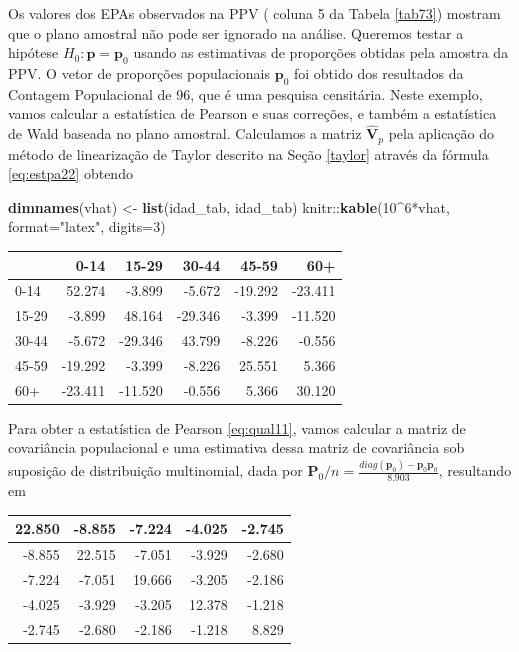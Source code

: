 \documentclass[]{book}
\newenvironment{Shaded}{\begin{snugshade}}{\end{snugshade}}
\newcommand{\KeywordTok}[1]{\textcolor[rgb]{0.13,0.29,0.53}{\textbf{{#1}}}}
\newcommand{\DataTypeTok}[1]{\textcolor[rgb]{0.13,0.29,0.53}{{#1}}}
\newcommand{\DecValTok}[1]{\textcolor[rgb]{0.00,0.00,0.81}{{#1}}}
\newcommand{\StringTok}[1]{\textcolor[rgb]{0.31,0.60,0.02}{{#1}}}
\newcommand{\NormalTok}[1]{{#1}}
\numberwithin{example}{chapter}
\numberwithin{remark}{chapter}
\numberwithin{definition}{chapter}
\begin{document}
Os valores dos EPAs observados na PPV ( coluna 5 da Tabela \ref{tab73})
mostram que o plano amostral não pode ser ignorado na análise. Queremos
testar a hipótese \(H_{0}:\mathbf{p=p}_{0}\) usando as estimativas de
proporções obtidas pela amostra da PPV. O vetor de proporções
populacionais \(\mathbf{p}_{0}\) foi obtido dos resultados da Contagem
Populacional de 96, que é uma pesquisa censitária. Neste exemplo, vamos
calcular a estatística de Pearson e suas correções, e também a
estatística de Wald baseada no plano amostral. Calculamos a matriz
\(\widehat{\mathbf{V}}_{p}\) pela aplicação do método de linearização de
Taylor descrito na Seção \ref{taylor} através da fórmula
\eqref{eq:estpa22} obtendo

\begin{Shaded}
\begin{Highlighting}[]
\KeywordTok{dimnames}\NormalTok{(vhat) <-}\StringTok{ }\KeywordTok{list}\NormalTok{(idad_tab, idad_tab)}
\NormalTok{knitr::}\KeywordTok{kable}\NormalTok{(}\DecValTok{10}\NormalTok{^}\DecValTok{6}\NormalTok{*vhat, }\DataTypeTok{format=}\StringTok{"latex"}\NormalTok{, }\DataTypeTok{digits=}\DecValTok{3}\NormalTok{)}
\end{Highlighting}
\end{Shaded}

\begin{tabular}{l|r|r|r|r|r}
\hline
  & 0-14 & 15-29 & 30-44 & 45-59 & 60+\\
\hline
0-14 & 52.274 & -3.899 & -5.672 & -19.292 & -23.411\\
\hline
15-29 & -3.899 & 48.164 & -29.346 & -3.399 & -11.520\\
\hline
30-44 & -5.672 & -29.346 & 43.799 & -8.226 & -0.556\\
\hline
45-59 & -19.292 & -3.399 & -8.226 & 25.551 & 5.366\\
\hline
60+ & -23.411 & -11.520 & -0.556 & 5.366 & 30.120\\
\hline
\end{tabular}

Para obter a estatística de Pearson \eqref{eq:qual11}, vamos calcular a
matriz de covariância populacional e uma estimativa dessa matriz de
covariância sob suposição de distribuição multinomial, dada por
\(\mathbf{P}_{0}/n=\frac{diag\left( \mathbf{p}_{0}\right) -\mathbf{p}_{0}\mathbf{p}_{0}^{^{\prime }}}{8.903}\),
resultando em

\begin{tabular}{r|r|r|r|r}
\hline
22.850 & -8.855 & -7.224 & -4.025 & -2.745\\
\hline
-8.855 & 22.515 & -7.051 & -3.929 & -2.680\\
\hline
-7.224 & -7.051 & 19.666 & -3.205 & -2.186\\
\hline
-4.025 & -3.929 & -3.205 & 12.378 & -1.218\\
\hline
-2.745 & -2.680 & -2.186 & -1.218 & 8.829\\
\hline
\end{tabular}
\end{document}
